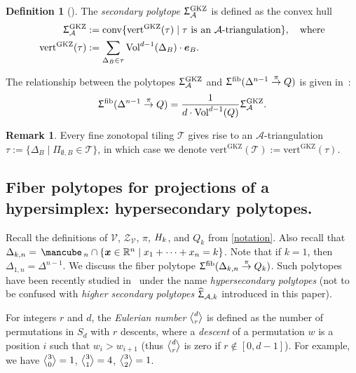 \documentclass[11pt]{amsart}
\theoremstyle{plain}
\theoremstyle{definition}
\newtheorem{definition}[theorem]{Definition}
\newtheorem{remark}[theorem]{Remark}
\def\R{\mathbb{R}}
\def\x{{\bm{x}}}
\def\A{\mathcal{A}}
\def\Acal{\mathcal{A}}
\def\V{\mathcal{V}}
\def\e{{\bm{e}}}
\def\conv{\mathrm{conv}}
\def\Tr{\tau}
\def\Zon{\mathcal{Z}}
\def\ZV{\Zon_\V}
\def\cube{\mbox{\,\mancube\,}}
\def\Vol{\mathrm{Vol}}
\def\GKZ{{\operatorname{GKZ}}}
\def\vert{\mathrm{vert}}
\def\vertGKZ{\vert^\GKZ}
\def\HSP{\widehat\Upsigma}
\def\Sigma{\HSP}
\def\fiber{{\operatorname{fib}}}
\def\FibPoly{\Upsigma^\fiber}
\def\SigmaGKZ{\Upsigma_\A^{\GKZ}}
\def\pito{\overset \pi \to}
\def\Tcal{\mathcal{T}}
\def\Tiling{\Tcal}
\def\tile{\Pi}
\def\Voldd{\Vol^{d-1}}
\def\VolDB{\Vol^{d-1}(\Delta_B)}
\newcommand{\Euli}{\genfrac{\langle}{\rangle}{0pt}{}}
\def\Eul(#1,#2){\Euli{#1}{#2}}
\begin{document}
\begin{definition}[{\cite[Definition~1.6]{GKZ}}]
The \emph{secondary polytope} $\SigmaGKZ$ is defined as the convex hull
\begin{align}
\SigmaGKZ&:=\conv\{\vertGKZ(\Tr)\mid \Tr\text{ is an $\Acal$-triangulation}\},\quad\text{where} \\
\label{eq:vertGKZ}
  \vertGKZ(\Tr)&:= \sum_{\Delta_B\in \Tr} \VolDB\cdot \e_B.
\end{align}
\end{definition}
\noindent The relationship between the polytopes $\SigmaGKZ$ and $\FibPoly(\Delta^{n-1}\pito Q)$ is given in~\cite[Theorem 2.5]{BS}:
\begin{equation*}\label{eq:BS2}
	\FibPoly(\Delta^{n-1}\pito Q)  = \frac{1}{d \cdot \Voldd(Q)} \SigmaGKZ.
\end{equation*}


\begin{remark}\label{rem:GKZ}
Every fine zonotopal tiling $\Tiling$ gives rise to an $\Acal$-triangulation $\Tr:=\{\Delta_B\mid \tile_{\emptyset,B}\in\Tiling\}$, in which case we denote $\vertGKZ(\Tiling):=\vertGKZ(\Tr)$.
\end{remark}

\subsection{Fiber polytopes for projections of a hypersimplex: hypersecondary polytopes.}
Recall the definitions of $\V$, $\ZV$, $\pi$, $H_k$, and $Q_k$
from \cref{notation}.
Also recall that $\Delta_{k,n}=\cube_n\cap \{\x\in\R^n\mid x_1+\dots+x_n=k\}$. 
Note that if $k=1$, then $\Delta_{1,n} = \Delta^{n-1}$.  
We discuss the fiber polytope $\FibPoly(\Delta_{k,n}\pito Q_k)$. Such polytopes have been recently studied in~\cite{OS} under the name \emph{hypersecondary polytopes} (not to be confused with \emph{higher secondary polytopes} $\Sigma_{\A,k}$ introduced in this paper).


For integers $r$ and $d$, the  \emph{Eulerian number} $\Eul(d,r)$  is defined as the number of permutations in $S_d$ with $r$ descents, where a \emph{descent} of a permutation $w$ is a position $i$ such that $w_i>w_{i+1}$  (thus $\Eul(d,r)$ is zero if $r\notin[0,d-1]$). For example, we have $\Eul(3,0)=1$, $\Eul(3,1)=4$, $\Eul(3,2)=1$. 
\end{document}
